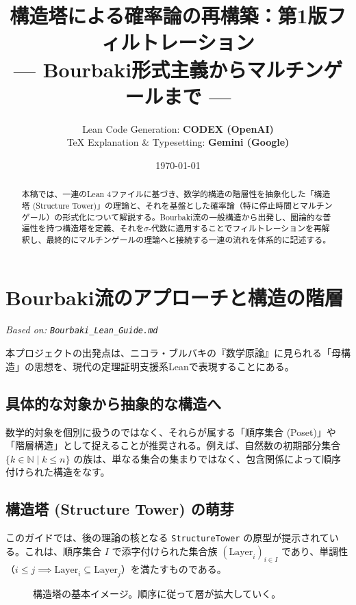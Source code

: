 \documentclass[a4paper,11pt]{ltjsarticle}
\title{\textbf{構造塔による確率論の再構築：第1版フィルトレーション} \\ \large --- Bourbaki形式主義からマルチンゲールまで ---}
\author{
    Lean Code Generation: \textbf{CODEX (OpenAI)} \\
    TeX Explanation \& Typesetting: \textbf{Gemini (Google)}
}
\date{\today}
\theoremstyle{definition}
\newcommand{\N}{\mathbb{N}}
\newcommand{\Layer}[1]{\mathrm{Layer}_{#1}}
\begin{document}
\maketitle

\begin{abstract}
本稿では、一連のLean 4ファイルに基づき、数学的構造の階層性を抽象化した「構造塔 (Structure Tower)」の理論と、それを基盤とした確率論（特に停止時間とマルチンゲール）の形式化について解説する。Bourbaki流の一般構造から出発し、圏論的な普遍性を持つ構造塔を定義、それを$\sigma$-代数に適用することでフィルトレーションを再解釈し、最終的にマルチンゲールの理論へと接続する一連の流れを体系的に記述する。
\end{abstract}

\tableofcontents
\newpage

\section{Bourbaki流のアプローチと構造の階層}
\label{sec:bourbaki}
\textit{Based on: \texttt{Bourbaki\_Lean\_Guide.md}}

本プロジェクトの出発点は、ニコラ・ブルバキの『数学原論』に見られる「母構造」の思想を、現代の定理証明支援系Leanで表現することにある。

\subsection{具体的な対象から抽象的な構造へ}
数学的対象を個別に扱うのではなく、それらが属する「順序集合 (Poset)」や「階層構造」として捉えることが推奨される。例えば、自然数の初期部分集合 $\{k \in \N \mid k \le n\}$ の族は、単なる集合の集まりではなく、包含関係によって順序付けられた構造をなす。

\subsection{構造塔 (Structure Tower) の萌芽}
このガイドでは、後の理論の核となる \texttt{StructureTower} の原型が提示されている。これは、順序集合 $I$ で添字付けられた集合族 $(\Layer{i})_{i \in I}$ であり、単調性（$i \le j \implies \Layer{i} \subseteq \Layer{j}$）を満たすものである。

\begin{figure}[h]
\centering
{}
\caption{構造塔の基本イメージ。順序に従って層が拡大していく。}
\end{figure}
\end{document}
